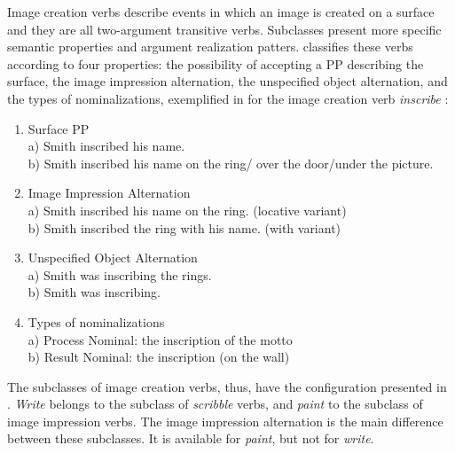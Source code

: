 \documentclass[english]{textolivre}
\begin{document}
Image creation verbs describe events in which an image is created on a surface and they are all two-argument transitive verbs. Subclasses present more specific semantic properties and argument realization patters. \textcite{levin_english_1993} classifies these verbs according to four properties: the possibility of accepting a PP describing the surface, the image impression alternation, the unspecified object alternation, and the types of nominalizations, exemplified in  for the image creation verb \textit{inscribe} \cite[p.~169]{levin_english_1993}:

\begin{enumerate}[label=(\arabic*),resume]
\item \label{itm22} Surface PP \\
a) Smith inscribed his name.\\
b) Smith inscribed his name on the ring/ over the door/under the picture.  
\item \label{itm23} Image Impression Alternation \\
a) Smith inscribed his name on the ring. (locative variant) \\
b) Smith inscribed the ring with his name. (with variant) 
\item \label{itm24} Unspecified Object Alternation \\
a) Smith was inscribing the rings. \\
b) Smith was inscribing.
\item \label{itm25} Types of nominalizations \\
a) Process Nominal: the inscription of the motto \\
b) Result Nominal: the inscription (on the wall)
\end{enumerate}
   
The subclasses of image creation verbs, thus, have the configuration presented in . \textit{Write} belongs to the subclass of \textit{scribble} verbs, and \textit{paint} to the subclass of image impression verbs. The image impression alternation is the main difference between these subclasses. It is available for \textit{paint}, but not for \textit{write}.
\end{document}
